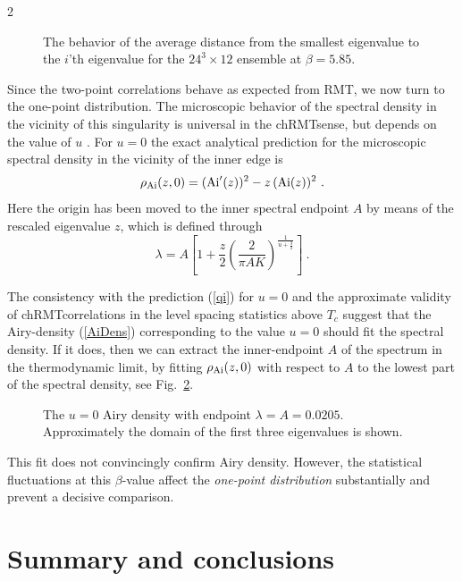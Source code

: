 \begin{multicols}{2}
\begin{figure}[h]
\centerline{}
\caption{The behavior of the average distance from the smallest eigenvalue to
the $i$'th eigenvalue  for the $24^3\times 12$ ensemble at $\beta=5.85$.}
\label{AND}
\end{figure}

Since the two-point correlations behave as expected from RMT,
we now turn to the one-point distribution.
The microscopic behavior of the spectral density in the vicinity of this
singularity is universal in the chRMT\space sense, but depends on the value  of
$u$ \cite{KaFr98}. For $u=0$ the exact analytical prediction for the
microscopic spectral density in the vicinity of the inner edge is \cite{Fo93}
\begin{equation}
\rho_{\rm Ai}(z,0)=({\rm Ai}'(z))^2-z\,({\rm Ai}(z))^2 \ .  
\label{AiDens}
\end{equation}
Here the origin has been moved to the inner spectral endpoint $A$ by means
of the rescaled eigenvalue $z$, which is defined through
\begin{equation}
\lambda=A\left[1+\frac{z}{2}\left(\frac{2}{\pi AK}\right)^\frac{1}{u+\frac{3}{2}}\right] \ .
\end{equation}


The consistency with the prediction (\ref{qi}) for $u=0$ and the approximate
validity of chRMT\space correlations in the level spacing statistics  above
$T_c$ suggest that the Airy-density (\ref{AiDens}) corresponding to the value
$u=0$ should fit the spectral density. If it does, then we can extract the
inner-endpoint $A$ of the spectrum in the thermodynamic limit, by fitting
$\rho_{\rm Ai}(z,0)$ with respect to $A$ to the lowest part of the spectral
density, see Fig.~\ref{AiryFig}.

\begin{figure}[h]
\centerline{}
\caption{The $u=0$ Airy density with
endpoint $\lambda=A=0.0205$. Approximately the domain of the first three
eigenvalues is shown.}
\label{AiryFig}
\end{figure}

This fit does not convincingly confirm Airy density. However,
the statistical fluctuations at this $\beta$-value affect the {\em one-point
distribution} substantially and prevent a decisive comparison.

\section{Summary and conclusions} 


\end{multicols}
